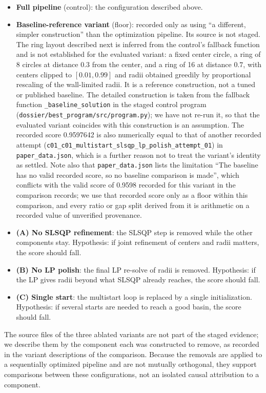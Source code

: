 \documentclass{article} %
\begin{document}
\begin{itemize}
\item \textbf{Full pipeline} (control): the configuration described above.
\item \textbf{Baseline-reference variant} (floor): recorded only as using ``a different, simpler construction'' than the optimization pipeline. Its source is not staged. The ring layout described next is inferred from the control's fallback function and is not established for the evaluated variant: a fixed center circle, a ring of 8 circles at distance $0.3$ from the center, and a ring of 16 at distance $0.7$, with centers clipped to $[0.01,0.99]$ and radii obtained greedily by proportional rescaling of the wall-limited radii. It is a reference construction, not a tuned or published baseline. The detailed construction is taken from the fallback function \texttt{\_baseline\_solution} in the staged control program (\texttt{dossier/best\_program/src/program.py}); we have not re-run it, so that the evaluated variant coincides with this construction is an assumption. The recorded score 0.9597642 is also numerically equal to that of another recorded attempt (\texttt{c01\_c01\_multistart\_slsqp\_lp\_polish\_attempt\_01}) in \texttt{paper\_data.json}, which is a further reason not to treat the variant's identity as settled. Note also that \texttt{paper\_data.json} lists the limitation ``The baseline has no valid recorded score, so no baseline comparison is made'', which conflicts with the valid score of 0.9598 recorded for this variant in the comparison records; we use that recorded score only as a floor within this comparison, and every ratio or gap split derived from it is arithmetic on a recorded value of unverified provenance.
\item \textbf{(A) No SLSQP refinement}: the SLSQP step is removed while the other components stay. Hypothesis: if joint refinement of centers and radii matters, the score should fall.
\item \textbf{(B) No LP polish}: the final LP re-solve of radii is removed. Hypothesis: if the LP gives radii beyond what SLSQP already reaches, the score should fall.
\item \textbf{(C) Single start}: the multistart loop is replaced by a single initialization. Hypothesis: if several starts are needed to reach a good basin, the score should fall.
\end{itemize}
The source files of the three ablated variants are not part of the staged evidence; we describe them by the component each was constructed to remove, as recorded in the variant descriptions of the comparison. Because the removals are applied to a sequentially optimized pipeline and are not mutually orthogonal, they support comparisons between these configurations, not an isolated causal attribution to a component.
\end{document}
